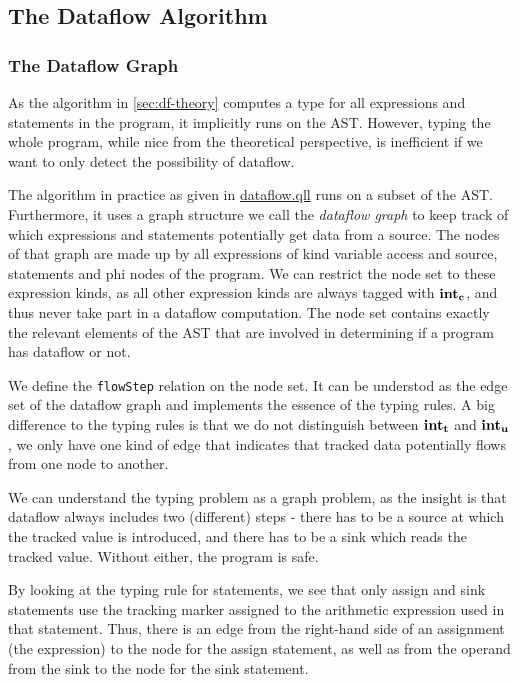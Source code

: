 \subsection{The Dataflow Algorithm}
\subsubsection*{The Dataflow Graph}
As the algorithm in \autoref{sec:df-theory} computes a type for all expressions and statements in the program,
it implicitly runs on the AST.
However, typing the whole program, while nice from the theoretical perspective, is 
inefficient if we want to only detect the possibility of dataflow.

The algorithm in practice as given in \hyperref[lst:dataflow]{dataflow.qll} runs on a subset of the AST.
Furthermore, it uses a graph structure we call the \emph{dataflow graph} to keep
track of which expressions and statements potentially get data from a source.
The nodes of that graph are made up by all expressions of kind variable access and source,
statements and phi nodes of the program.
We can restrict the node set to these expression kinds, as all other expression kinds
are always tagged with $\textbf{int}_\textbf{c}$, and thus never take part in a dataflow computation.
The node set contains  exactly the relevant elements of the AST that are involved in determining
if a program has dataflow or not.

We define the \texttt{flowStep} relation on the node set.
It can be understod as the edge set of the dataflow graph and implements the
essence of the typing rules.
A big difference to the typing rules is that we do not distinguish between $\textbf{int}_\textbf{t}$ and $\textbf{int}_\textbf{u}$,
we only have one kind of edge that indicates that tracked data potentially flows 
from one node to another.

We can understand the typing problem as a graph problem, as the insight is that
dataflow always includes two (different) steps - there has to be a source at which 
the tracked value is introduced, and there has to be a sink which reads the tracked value.
Without either, the program is safe.

By looking at the typing rule for statements, we see that only assign and sink statements
use the tracking marker assigned to the arithmetic expression used in that statement.
Thus, there is an edge from the right-hand side of an assignment (the expression) 
to the node for the assign statement, as well as from the operand from the sink 
to the node for the sink statement.

